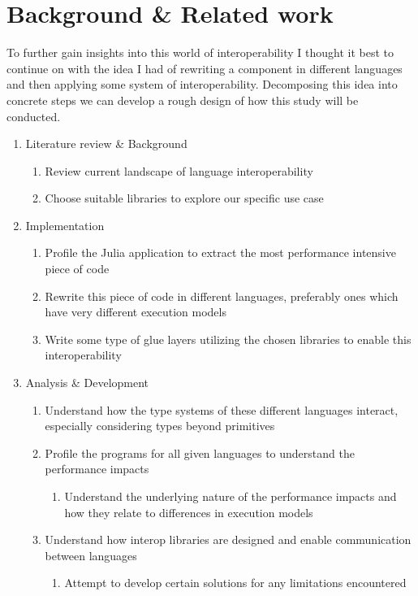 \section{Background \& Related work}\label{s:background}

To further gain insights into this world of interoperability I thought it best to continue on with the idea I had of rewriting a component in different languages and then applying some system of interoperability. Decomposing this idea into concrete steps we can develop a rough design of how this study will be conducted.
\begin{enumerate}
    \item Literature review \& Background
    \begin{enumerate}
        \item Review current landscape of language interoperability
        \item Choose suitable libraries to explore our specific use case
    \end{enumerate}
    \item Implementation
    \begin{enumerate}
        \item Profile the Julia application to extract the most performance intensive piece of code
        \item Rewrite this piece of code in different languages, preferably ones which have very different execution models
        \item Write some type of glue layers utilizing the chosen libraries to enable this interoperability
    \end{enumerate}
    \item Analysis \& Development
    \begin{enumerate}
        \item Understand how the type systems of these different languages interact, especially considering types beyond primitives
        \item Profile the programs for all given languages to understand the performance impacts
        \begin{enumerate}
            \item Understand the underlying nature of the performance impacts and how they relate to differences in execution models
        \end{enumerate}
        \item Understand how interop libraries are designed and enable communication between languages
        \begin{enumerate}
            \item Attempt to develop certain solutions for any limitations encountered
        \end{enumerate}
    \end{enumerate}
\end{enumerate}

